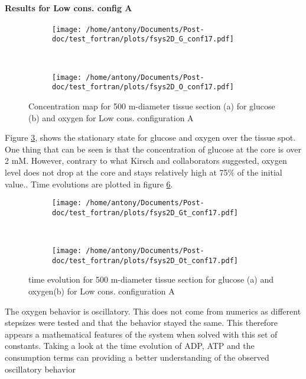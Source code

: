 \documentclass[11pt,a4paper]{article}
\begin{document}
\paragraph{Results for Low cons. config A}
\begin{figure}[ht!]
	\begin{subfigure}{0.45\textwidth}
	\centering
	\texttt{[image: /home/antony/Documents/Post-doc/test\_fortran/plots/fsys2D\_G\_conf17.pdf]}
	\caption{ \label{G_conf17}}
	\end{subfigure}
	~~
	\begin{subfigure}{0.45\textwidth}
	\texttt{[image: /home/antony/Documents/Post-doc/test\_fortran/plots/fsys2D\_O\_conf17.pdf]}
		\caption{ \label{O_conf17}}
	\end{subfigure}
	\caption{Concentration map for 500 \textmu m-diameter tissue section  (a) for glucose (b) and oxygen \label{conf17} for Low cons. configuration A}
\end{figure} 

Figure \ref{conf17}, shows the stationary state for glucose and oxygen over the tissue spot. One thing that can be seen is that the concentration of glucose at the core is over 2 mM. However, contrary to what Kirsch and collaborators suggested, oxygen level does not drop at the core and stays relatively high at 75\% of the initial value.. Time evolutions are plotted in figure \ref{tconf17}.

\begin{figure}[ht!]
	\begin{subfigure}{0.45\textwidth}
	\centering
	\texttt{[image: /home/antony/Documents/Post-doc/test\_fortran/plots/fsys2D\_Gt\_conf17.pdf]}
	\caption{ \label{Gt_conf17}}
	\end{subfigure}
	~~
	\begin{subfigure}{0.45\textwidth}
	\texttt{[image: /home/antony/Documents/Post-doc/test\_fortran/plots/fsys2D\_Ot\_conf17.pdf]}
		\caption{ \label{Ot_conf17}}
	\end{subfigure}
	\caption{time evolution for 500 \textmu m-diameter tissue section  for glucose (a) and oxygen(b) for Low cons. configuration A \label{tconf17}}
\end{figure}

The oxygen behavior is oscillatory. This does not come from numerics as different stepsizes were tested and that the behavior stayed the same. This therefore appears a mathematical features of the system  when solved with this set of constants. Taking a look at the time evolution of ADP, ATP and the consumption terms can providing a better understanding of the observed oscillatory behavior
\end{document}
